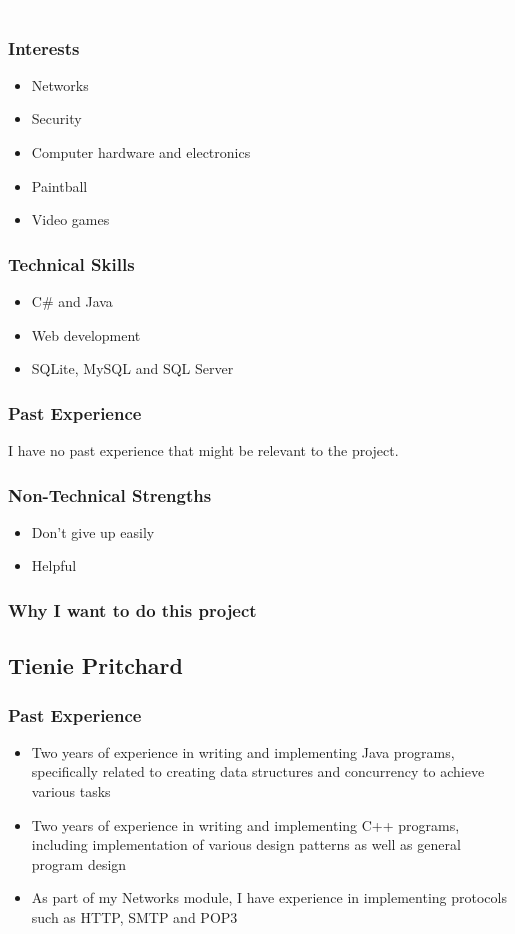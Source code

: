 \textcolor{white}{.}
\subsubsection{Interests}
	\begin{itemize}
		\item Networks
		\item Security
		\item Computer hardware and electronics
		\item Paintball
		\item Video games
	\end{itemize}
\subsubsection{Technical Skills} 
	\begin{itemize}
		\item C\# and Java
		\item Web development
		\item SQLite, MySQL and SQL Server
	\end{itemize}
\subsubsection{Past Experience}
I have no past experience that might be relevant to the project. %
\subsubsection{Non-Technical Strengths}
	\begin{itemize}
		\item Don't give up easily
		\item Helpful
	\end{itemize}
\subsubsection{Why I want to do this project} 

\pagebreak
\subsection{Tienie Pritchard}

\subsubsection{Past Experience} 
\begin{itemize}
	\item{Two years of experience in writing and implementing Java programs, specifically related to creating data structures and concurrency to achieve various tasks}
	\item{Two years of experience in writing and implementing C++ programs, including implementation of various design patterns as well as general program design}
	\item{As part of my Networks module, I have experience in implementing protocols such as HTTP, SMTP and POP3}
\end{itemize}
